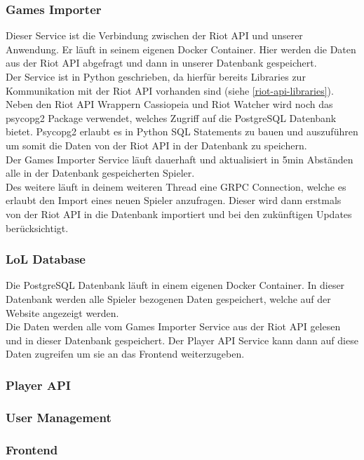 \subsubsection{Games Importer}
Dieser Service ist die Verbindung zwischen der Riot API und unserer Anwendung. Er läuft in seinem eigenen Docker Container. Hier werden die Daten aus der Riot API abgefragt und dann in unserer Datenbank gespeichert.\\
Der Service ist in Python geschrieben, da hierfür bereits Libraries zur Kommunikation mit der Riot API vorhanden sind (siehe \ref{riot-api-libraries}).\\
Neben den Riot API Wrappern Cassiopeia und Riot Watcher wird noch das psycopg2 Package verwendet, welches Zugriff auf die PostgreSQL Datenbank bietet. Psycopg2 erlaubt es in Python SQL Statements zu bauen und auszuführen um somit die Daten von der Riot API in der Datenbank zu speichern.\\
Der Games Importer Service läuft dauerhaft und aktualisiert in 5min Abständen alle in der Datenbank gespeicherten Spieler. \\
Des weitere läuft in deinem weiteren Thread eine GRPC Connection, welche es erlaubt den Import eines neuen Spieler anzufragen. Dieser wird dann erstmals von der Riot API in die Datenbank importiert und bei den zukünftigen Updates berücksichtigt.

\subsubsection{LoL Database}
Die PostgreSQL Datenbank läuft in einem eigenen Docker Container. In dieser Datenbank werden alle Spieler bezogenen Daten gespeichert, welche auf der Website angezeigt werden.\\
Die Daten werden alle vom Games Importer Service aus der Riot API gelesen und in dieser Datenbank gespeichert. Der Player API Service kann dann auf diese Daten zugreifen um sie an das Frontend weiterzugeben.

\subsubsection{Player API}

\subsubsection{User Management}

\subsubsection{Frontend}

